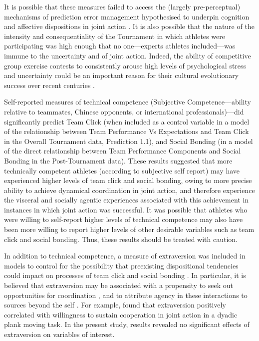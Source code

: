 \begin{CJK}{UTF8}{gbsn}
It is possible that these measures failed to access the (largely pre-perceptual) mechanisms of prediction error management hypothesised to underpin cognition and affective dispositions in joint action \citep{Clark2013}.  It is also possible that the nature of the intensity and consequentiality of the Tournament in which athletes were participating was high enough that no one---experts athletes included---was immune to the uncertainty and of joint action.  Indeed, the ability of competitive group exercise contests to consistently arouse high levels of psychological stress and uncertainty could be an important reason for their cultural evolutionary success over recent centuries \citep{Dunbar2010,Whitehouse2004}.

Self-reported measures of technical competence (Subjective Competence---ability relative to teammates, Chinese opponents, or international professionals)—did significantly
predict Team Click (when included as a control variable in a model of the relationship between Team Performance Vs Expectations and Team Click in the Overall Tournament data, Prediction 1.1), and Social Bonding (in a model of the direct relationship between Team Performance Components and Social Bonding in the Post-Tournament data).  These results suggested that more technically competent athletes (according to subjective self report) may have experienced higher levels of team click and social bonding, owing to more precise ability to achieve dynamical coordination in joint action, and therefore experience the visceral and socially agentic experiences associated with this achievement in instances in which joint action was successful.  It was possible that athletes who were willing to self-report higher levels of technical competence may also have been more willing to report higher levels of other desirable variables such as team click and social bonding. Thus, these results should be treated with caution.

In addition to technical competence, a measure of extraversion was included in models to control for the possibility that preexisting dispositional tendencies could impact on processes of team click and social bonding \citep{Marsh2009,VonRueden2015}.  In particular, it is believed that extraversion may be associated with a propensity to seek out opportunities for coordination \citep{Richardson2007a}, and to attribute agency in these interactions to sources beyond the self \citep[also known as external locus of control; see][]{Morris1981}. For example, \textcite{Richardson2007a} found that extraversion positively correlated with willingness to sustain cooperation in joint action in a dyadic plank moving task.  In the present study, results revealed no significant effects of extraversion on variables of interest.


\end{CJK}
